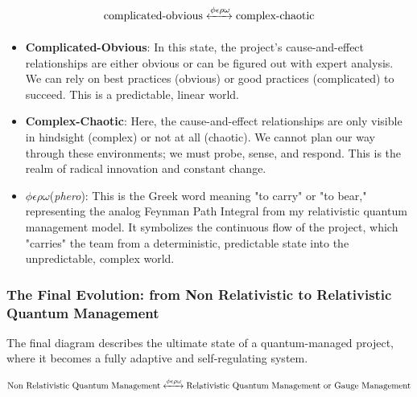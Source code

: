 \documentclass{article}
\begin{document}
\begin{equation}
\text{complicated-obvious} \xleftrightarrow[\text{}]{\phi \epsilon \rho \omega} \text{complex-chaotic}
\end{equation}

\begin{itemize}
\item \textbf{Complicated-Obvious}: In this state, the project's cause-and-effect relationships are either obvious or can be figured out with expert analysis. We can rely on best practices (obvious) or good practices (complicated) to succeed. This is a predictable, linear world.
\item \textbf{Complex-Chaotic}: Here, the cause-and-effect relationships are only visible in hindsight (complex) or not at all (chaotic). We cannot plan our way through these environments; we must probe, sense, and respond. This is the realm of radical innovation and constant change.
\item $\phi \epsilon \rho \omega$(\textit{phero}): This is the Greek word meaning "to carry" or "to bear," representing the analog Feynman Path Integral from my relativistic quantum management model. It symbolizes the continuous flow of the project, which "carries" the team from a deterministic, predictable state into the unpredictable, complex world.
\end{itemize}
\newpage
\subsubsection*{The Final Evolution: from Non Relativistic to Relativistic Quantum Management}
The final diagram describes the ultimate state of a quantum-managed project, where it becomes a fully adaptive and self-regulating system.

\begin{equation}
\text{Non Relativistic Quantum Management} \xleftrightarrow[\text{}]{\phi \epsilon \rho \omega} \text{Relativistic Quantum Management or Gauge Management}
\end{equation}
\end{document}
